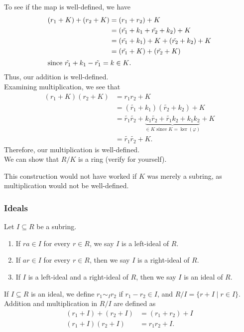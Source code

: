 \documentclass[10pt]{extarticle}
\begin{document}
  To see if the map is well-defined, we have
  \begin{align*}
    (r_1 + K) + (r_2 + K) &= (r_1 + r_2) + K\\
                          &= (\tilde{r_1} + k_1 + \tilde{r_2} + k_2) + K\\
                          &= (\tilde{r_1} + k_1) + K + (\tilde{r_2} + k_2) + K\\
                          &= (\tilde{r_1} + K) + (\tilde{r_2} + K)\\
    \shortintertext{since $\tilde{r_1} + k_1 - \tilde{r_1} = k\in K$.}
  \end{align*}
  Thus, our addition is well-defined.\\

  Examining multiplication, we see that
  \begin{align*}
    (r_1 + K)  (r_2 + K) &= r_1r_2 + K\\
                         &= (\tilde{r_1} + k_1)(\tilde{r_2} + k_2) + K\\
                         &= \tilde{r_1}\tilde{r_2} + \underbrace{k_1\tilde{r_2} + \tilde{r_1}k_2 + k_1k_2}_{\in K \text{ since $K = \ker(\varphi)$}} + K\\
                         &= \tilde{r_1}\tilde{r_2} + K.
  \end{align*}
  Therefore, our multiplication is well-defined.\\

  We can show that $R/K$ is a ring (verify for yourself).
  \begin{description}
    \small
    \item[Note:] This construction would not have worked if $K$ was merely a subring, as multiplication would not be well-defined.
  \end{description}
  \subsubsection{Ideals}%
  Let $I\subseteq R$ be a subring.
  \begin{enumerate}[(1)]
    \item If $ra\in I$ for every $r \in R$, we say $I$ is a left-ideal of $R$.
    \item If $ar\in I$ for every $r\in R$, then we say $I$ is a right-ideal of $R$.
    \item If $I$ is a left-ideal and a right-ideal of $R$, then we say $I$ is an ideal of $R$.
  \end{enumerate}
  If $I\subseteq R$ is an ideal, we define $r_1\sim_{I}r_2$ if $r_1-r_2 \in I$, and $R/I = \{r+I\mid r\in I\}$. Addition and multiplication in $R/I$ are defined as
  \begin{align*}
    (r_1 + I) + (r_2 + I) &= (r_1 + r_2) + I\\
    (r_1 + I)(r_2 + I) &= r_1r_2 + I.
  \end{align*}
\end{document}
